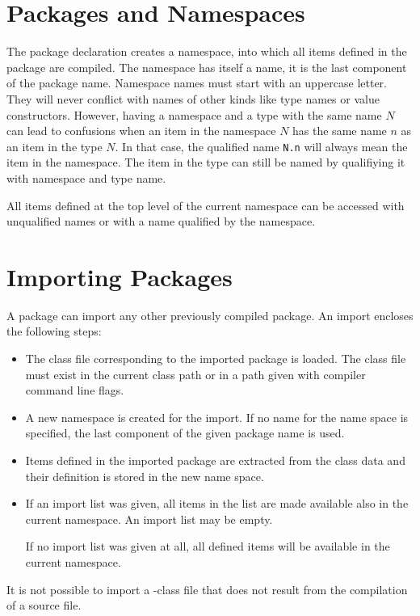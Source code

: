 \section{Packages and Namespaces}

The package declaration creates a namespace, into which all items
defined in the package are compiled. The namespace has itself a name,
it is the last component of the package name. Namespace names must start
with an uppercase letter. They will never conflict with names of other
kinds like type names or value constructors. However, having a namespace and a type with the same name $N$ can lead to confusions when an item in the namespace $N$ has the same name $n$ as an item in the type $N$.
In that case, the qualified name \texttt{N.n} will always mean the item in the namespace.
The item in the type can still be named by qualifiying it with namespace and type name.

All items defined at the top level of the current namespace can be
accessed with unqualified names or with a name qualified by the
namespace.

\section{Importing Packages} \label{import} 

A package can import any other previously compiled package. An import
encloses the following steps:
\begin{itemize}
\item The class file corresponding to the imported package is loaded.
The class file must exist in the current class path or in a path given
with compiler command line flags.
\item A new namespace is created for the import. If no name for the name
space is specified, the last component of the given package name is
used.
\item Items defined in the imported package are extracted from the class
data and their definition is stored in the new name space.
\item If an import list was given, all items in the list are made
available also in the current namespace. An import list may be empty.

If no import list was given at all, all
defined items will be available in the current namespace.

\end{itemize}

It is not possible to import a \java{}-class file that does not result
from the compilation of a \frege{} source file.

